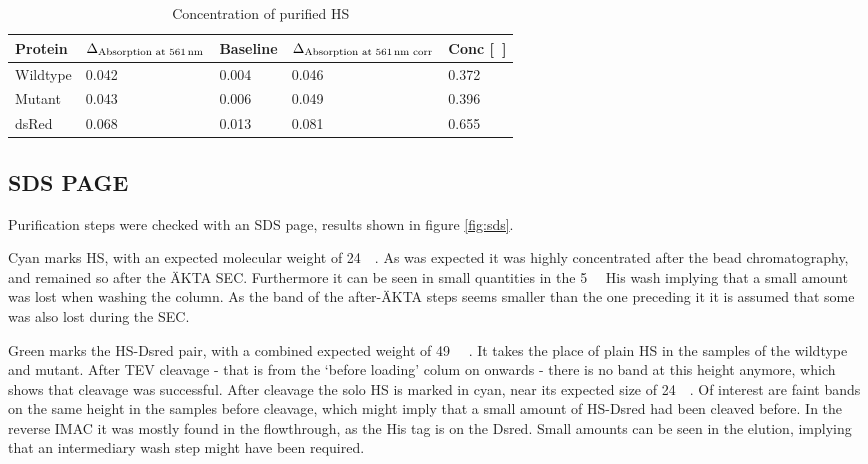 \begin{table}
	\centering
	\begin{tabu}{lllll}
		\toprule
		Protein & $\Delta_{\text{Absorption at \SI{561}{\nm}}}$ & Baseline & $\Delta_{\text{Absorption at \SI{561}{\nm} corr}}$ & Conc [\si{\milli\Molar}] \\
		\midrule
		Wildtype & 0.042 & 0.004 & 0.046 & 0.372 \\
		Mutant & 0.043 & 0.006 & 0.049 & 0.396 \\
		dsRed & 0.068 & 0.013 & 0.081 & 0.655 \\
		\bottomrule
	\end{tabu}
	\caption{Concentration of purified HS}
	\label{tbl:hs_concentration}
\end{table}

\subsection{SDS PAGE}

Purification steps were checked with an SDS page, results shown in figure
\ref{fig:sds}.


Cyan marks HS, with an expected molecular weight of
\SI{24}{\kilo\Da}\cite{pdb}. As was expected it was highly concentrated after
the  bead chromatography, and remained so after the ÄKTA SEC.
Furthermore it can be seen in small quantities in the \SI{5}{\milli\Molar} His
wash implying that a small amount was lost when washing the column. As the band
of the after-ÄKTA steps seems smaller than the one preceding it it is assumed
that some was also lost during the SEC.


Green marks the HS-Dsred pair, with a combined expected weight of
\SI{49}{\kilo\Da} \cite{pdb}. It takes the place of plain HS in the samples of
the wildtype and mutant. After TEV cleavage - that is from the `before loading'
colum on onwards - there is no band at this height anymore, which shows that
cleavage was successful. After cleavage the solo HS is marked in cyan, near its
expected size of \SI{24}{\kilo\Da}. Of interest are faint bands on the same
height in the samples before cleavage, which might imply that a small amount of
HS-Dsred had been cleaved before. In the reverse IMAC it was mostly found in
the flowthrough, as the His tag is on the Dsred. Small amounts can be seen in
the elution, implying that an intermediary wash step might have been required.

